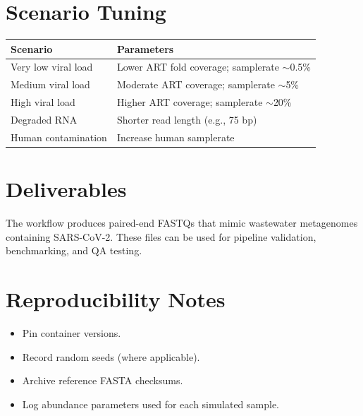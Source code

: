 \documentclass[11pt]{article}
\begin{document}
\section*{Scenario Tuning}
\begin{longtable}{p{} p{}}
\toprule
\textbf{Scenario} & \textbf{Parameters} \\
\midrule
Very low viral load & Lower ART fold coverage; samplerate $\sim$0.5\% \\
Medium viral load & Moderate ART coverage; samplerate $\sim$5\% \\
High viral load & Higher ART coverage; samplerate $\sim$20\% \\
Degraded RNA & Shorter read length (e.g., 75 bp) \\
Human contamination & Increase human samplerate \\
\bottomrule
\end{longtable}

\section*{Deliverables}
The workflow produces paired-end FASTQs that mimic wastewater metagenomes containing SARS-CoV-2. These files can be used for pipeline validation, benchmarking, and QA testing.

\section*{Reproducibility Notes}
\begin{itemize}
  \item Pin container versions.
  \item Record random seeds (where applicable).
  \item Archive reference FASTA checksums.
  \item Log abundance parameters used for each simulated sample.
\end{itemize}
\end{document}
